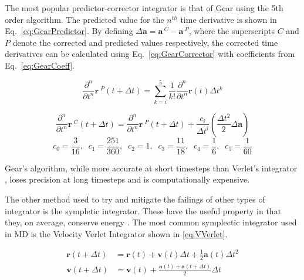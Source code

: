 \documentclass[12pt]{UoAthesis}
\begin{document}
The most popular predictor-corrector integrator is that of Gear
\cite{Gear1971} using the 5th order algorithm. The predicted value for
the $n^{th}$ time derivative is shown in
Eq.~\eqref{eq:GearPredictor}. By defining $\Delta \mathbf{a} =
\mathbf{a}\,^{C} - \mathbf{a}\,^{P}$, where the superscripts $C$ and
$P$ denote the corrected and predicted values respectively, the
corrected time derivatives can be calculated using
Eq.~\eqref{eq:GearCorrector} with coefficients from
Eq.~\eqref{eq:GearCoeff}.

\begin{equation} 
  \frac{\partial^{n}}{\partial t^{n}} \mathbf{r}\:^{P}(t+\Delta t)
  =\sum^{5}_{k=i} \frac{1}{k!}\frac{\partial^{n} }{\partial t^{n}}
  \mathbf{r}(t) \Delta t^{k} 
  \label{eq:GearPredictor} 
\end{equation}

\begin{equation} 
  \frac{\partial^{n}}{\partial t^{n}} \mathbf{r}\:^{C}(t+\Delta t)
  =\frac{\partial^{n} }{\partial t^{n}} \mathbf{r}\:^{P}(t+\Delta t)
  +\frac{c_i}{\Delta t^i} \left(\frac{\Delta t^2}{2}\Delta \mathbf{a}\right)
  \label{eq:GearCorrector} \end{equation} \begin{equation} c_0 =
  \frac{3}{16},\;\;c_1 = \frac{251}{360},\;\; c_2 = 1,\;\; c_3 =
  \frac{11}{18},\;\; c_4 =
  \frac{1}{6},\;\; c_5 = \frac{1}{60} \label{eq:GearCoeff} 
\end{equation}

Gear's algorithm, while more accurate at short timesteps than
Verlet's integrator \cite{Haile1997}, loses precision at long
timesteps and is computationally expensive.

The other method used to try and mitigate the failings of other types
of integrator is the sympletic integrator.  These have the useful
property in that they, on average, conserve energy
\cite{Hairer2003}. The most common symplectic integrator used in MD is
the Velocity Verlet Integrator \cite{Swope1982} shown in
\eqref{eq:VVerlet}.

\begin{subequations}
\label{eq:VVerlet}
\begin{align}
 \mathbf{r}(t + \Delta t) &= \mathbf{r}(t) + \mathbf{v}(t) \Delta t 
 + \frac{1}{2}\mathbf{a}(t) \Delta t^2
 \label{eq:VVerletpos} \\
 \mathbf{v}(t+\Delta t) &= \mathbf{v}(t) + \frac{\mathbf{a}(t) 
   + \mathbf{a}(t+\Delta t)}{2}\Delta t
 \label{eq:VVerletVel}
\end{align}
\end{subequations}
\end{document}
